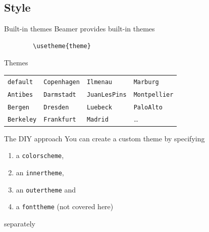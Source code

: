 \documentclass[xcolor=x11names, xcolor=table]{beamer}
\begin{document}
\subsection{Style}
\begin{frame}[fragile]{Built-in themes}
    Beamer provides built-in themes %

    \begin{verbatim}
        \usetheme{theme}
    \end{verbatim}

    \begin{block}{Themes}
    \begin{table}
    \begin{tabular}{llll}
        \texttt{default}  & \texttt{Copenhagen} & \texttt{Ilmenau}     & \texttt{Marburg}\\
        \texttt{Antibes}  & \texttt{Darmstadt}  & \texttt{JuanLesPins} & \texttt{Montpellier}\\
        \texttt{Bergen}   & \texttt{Dresden}    & \texttt{Luebeck}     & \texttt{PaloAlto}\\
        \texttt{Berkeley} & \texttt{Frankfurt}  & \texttt{Madrid}      & \dots\\
    \end{tabular}
    \end{table}
    \end{block}

\end{frame}


\begin{frame}[fragile]{The DIY approach}
You can create a custom theme by specifying
\begin{enumerate}
    \item a \texttt{colorscheme},
    \item an \texttt{innertheme},
    \item an \texttt{outertheme} and
    \item a \texttt{fonttheme} {\color{darkgray} (not covered here)}
\end{enumerate}
separately
\end{frame}
\end{document}
